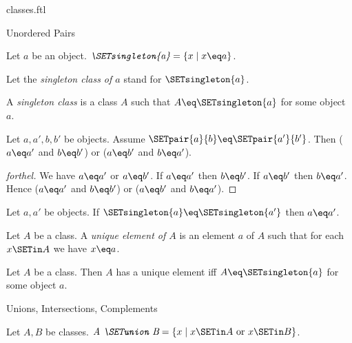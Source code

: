 \documentclass{stex}
\begin{document}
\begin{smodule}{classes.ftl}
\begin{sfragment}{Unordered Pairs}
  \begin{definition}[forthel,id=FOUNDATIONS_01_1160414603771904]
    Let $a$ be an object.
    $\emph{\SETsingleton{a}} = \{ x \mid x \eq a \}$.

    Let the \emph{singleton class of $a$} stand for $\SETsingleton{a}$.
  \end{definition}

  \begin{definition}[forthel,id=FOUNDATIONS_01_6786618161627136]
    A \emph{singleton class} is a class $A$ such that $A \eq \SETsingleton{a}$ for some object $a$.
  \end{definition}

  \begin{proposition}[forthel,id=FOUNDATIONS_01_6125259604361216]
    Let $a, a', b, b'$ be objects.
    Assume $\SETpair{a}{b} \eq \SETpair{a'}{b'}$.
    Then ($a \eq a'$ and $b \eq b'$) or ($a \eq b'$ and $b \eq a'$).
  \end{proposition}
  \begin{proof}[forthel]
    We have $a \eq a'$ or $a \eq b'$.
    If $a \eq a'$ then $b \eq b'$.
    If $a \eq b'$ then $b \eq a'$.
    Hence ($a \eq a'$ and $b \eq b'$) or ($a \eq b'$ and $b \eq a'$).
  \end{proof}

  \begin{corollary}[forthel,id=FOUNDATIONS_01_6954678910713856]
    Let $a, a'$ be objects.
    If $\SETsingleton{a} \eq \SETsingleton{a'}$ then $a \eq a'$.
  \end{corollary}

  \begin{definition}[forthel,id=FOUNDATIONS_01_29867480293464351]
    Let $A$ be a class.
    A \emph{unique element of $A$} is an element $a$ of $A$ such that for each $x \SETin A$ we have $x \eq a$.
  \end{definition}

  \begin{proposition}[forthel,id=FOUNDATIONS_01_0166348647163481]
    Let $A$ be a class.
    Then $A$ has a unique element iff $A \eq \SETsingleton{a}$ for some object $a$.
  \end{proposition}
\end{sfragment}

\begin{sfragment}{Unions, Intersections, Complements}
  \begin{definition}[forthel,id=FOUNDATIONS_01_2159753924968448]
    Let $A, B$ be classes.
    $\emph{A \SETunion B} = \{ x \mid x \SETin A\text{ or }x \SETin B \}$.


\end{definition}
\end{sfragment}
\end{smodule}
\end{document}
